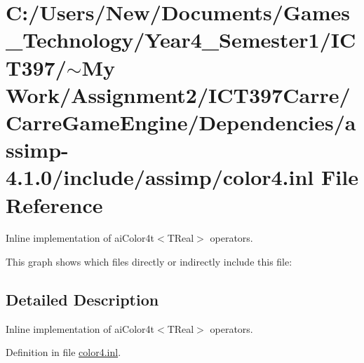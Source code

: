 \hypertarget{color4_8inl}{
\section{C:/Users/New/Documents/Games\_\-Technology/Year4\_\-Semester1/ICT397/$\sim$My Work/Assignment2/ICT397Carre/CarreGameEngine/Dependencies/assimp-4.1.0/include/assimp/color4.inl File Reference}
\label{color4_8inl}
}
Inline implementation of aiColor4t$<$TReal$>$ operators. 



This graph shows which files directly or indirectly include this file:

\subsection{Detailed Description}
Inline implementation of aiColor4t$<$TReal$>$ operators. 



Definition in file \hyperlink{color4_8inl-source}{color4.inl}.